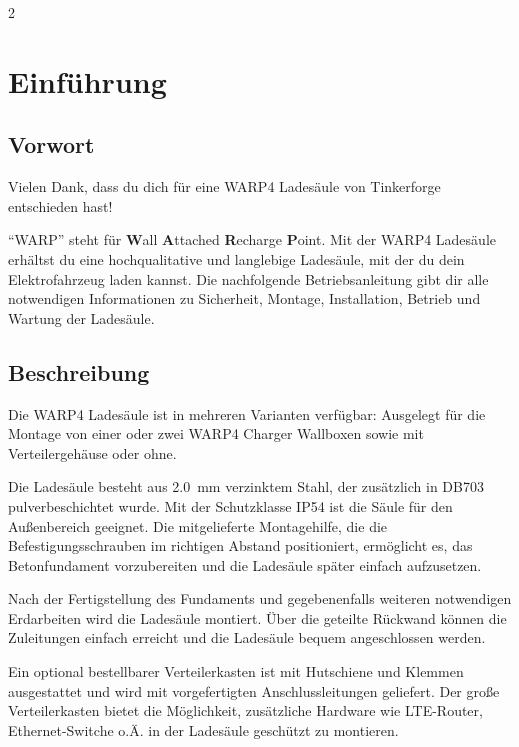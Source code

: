 \documentclass[a4paper,10pt]{article}
\begin{document}
\hypersetup{pageanchor=true}
\pagestyle{fancy}
\begin{multicols}{2}
    \raggedcolumns
	\tableofcontents \section{Einführung}
	\subsection{Vorwort} Vielen Dank, dass du
	dich für eine WARP4 Ladesäule von Tinkerforge entschieden hast!

	\enquote{WARP} steht
	für \textbf{W}all \textbf{A}ttached
	\textbf{R}echarge \textbf{P}oint. Mit der WARP4 Ladesäule
	erhältst du eine hochqualitative und langlebige Ladesäule, mit der du dein
	Elektrofahrzeug laden kannst. Die nachfolgende Betriebsanleitung gibt dir
	alle notwendigen Informationen zu Sicherheit, Montage, Installation, Betrieb
	und Wartung der Ladesäule.

	\subsection{Beschreibung}

	Die WARP4 Ladesäule ist in mehreren Varianten verfügbar:
	Ausgelegt für die Montage von einer oder zwei WARP4 Charger Wallboxen sowie
	mit Verteilergehäuse oder ohne.
	\par
	Die Ladesäule besteht aus \SI{2.0}{\milli\meter}
	verzinktem Stahl, der zusätzlich in DB703 pulverbeschichtet wurde. Mit der Schutzklasse IP54
	ist die Säule für den
	Außenbereich geeignet. Die mitgelieferte Montagehilfe, die die Befestigungsschrauben im
	richtigen Abstand positioniert, ermöglicht es, das Betonfundament
	vorzubereiten und die Ladesäule später einfach aufzusetzen.
	\par
	Nach der Fertigstellung des Fundaments und gegebenenfalls weiteren
	notwendigen Erdarbeiten wird die Ladesäule montiert.
	Über die geteilte Rückwand können die Zuleitungen einfach erreicht und
	die Ladesäule bequem angeschlossen werden.
	\par
	Ein optional bestellbarer
	Verteilerkasten ist mit Hutschiene und Klemmen ausgestattet und wird mit
	vorgefertigten Anschlussleitungen geliefert. Der große Verteilerkasten
	bietet die Möglichkeit, zusätzliche Hardware wie LTE-Router, Ethernet-Switche
	o.Ä. in der Ladesäule geschützt zu montieren.

\vspace{-0.2cm}

\end{multicols}
\end{document}
